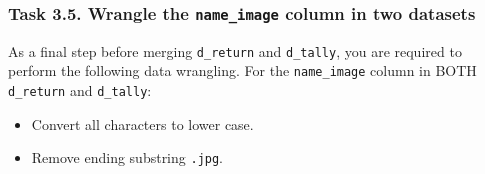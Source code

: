 \documentclass[
]{article}
\newenvironment{Shaded}{\begin{snugshade}}{\end{snugshade}}
\newcommand{\CommentTok}[1]{\textcolor[rgb]{0.56,0.35,0.01}{\textit{#1}}}
\newcommand{\FunctionTok}[1]{\textcolor[rgb]{0.13,0.29,0.53}{\textbf{#1}}}
\newcommand{\NormalTok}[1]{#1}
\newcommand{\OtherTok}[1]{\textcolor[rgb]{0.56,0.35,0.01}{#1}}
\newcommand{\SpecialCharTok}[1]{\textcolor[rgb]{0.81,0.36,0.00}{\textbf{#1}}}
\newcommand{\StringTok}[1]{\textcolor[rgb]{0.31,0.60,0.02}{#1}}
\begin{document}
\clearpage

\hypertarget{task-3.5.-wrangle-the-name_image-column-in-two-datasets}{%
\subsubsection{\texorpdfstring{Task 3.5. Wrangle the
\texttt{name\_image} column in two
datasets}{Task 3.5. Wrangle the name\_image column in two datasets}}\label{task-3.5.-wrangle-the-name_image-column-in-two-datasets}}

As a final step before merging \texttt{d\_return} and \texttt{d\_tally},
you are required to perform the following data wrangling. For the
\texttt{name\_image} column in BOTH \texttt{d\_return} and
\texttt{d\_tally}:

\begin{itemize}
\item
  Convert all characters to lower case.
\item
  Remove ending substring \texttt{.jpg}.
\end{itemize}

\begin{Shaded}
\end{Shaded}
\end{document}
